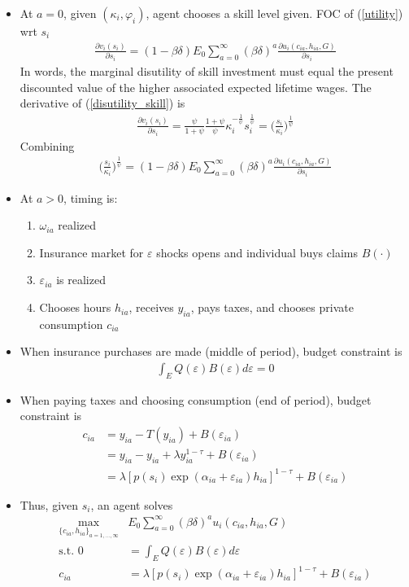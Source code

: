 \documentclass{article}
\begin{document}
\begin{itemize}
\item At $a = 0$, given $(\kappa_i, \varphi_i)$, agent chooses a skill level given. FOC of (\ref{utility}) wrt $s_i$
\begin{align*}
\frac{\partial v_i(s_i)}{\partial s_i} = (1 - \beta \delta) E_0 \sum_{a = 0}^\infty (\beta \delta)^a \frac{\partial u_i(c_{ia}, h_{ia}, G)}{\partial s_i}
\end{align*}
In words, the marginal disutility of skill investment must equal the present discounted value of the higher associated expected lifetime wages. The derivative of (\ref{disutility_skill}) is
\begin{align*}
\frac{\partial v_i(s_i)}{\partial s_i} = \frac{\psi}{1 + \psi} \frac{1 + \psi}{\psi}\kappa_i^{-\frac{1}{\psi}} s_i^\frac{1}{\psi} = \Bigg(\frac{s_i}{\kappa_i}\Bigg)^{\frac{1}{\psi}}
\end{align*}
Combining
\begin{align}
\Bigg(\frac{s_i}{\kappa_i}\Bigg)^{\frac{1}{\psi}} = (1 - \beta \delta) E_0 \sum_{a = 0}^\infty (\beta \delta)^a \frac{\partial u_i(c_{ia}, h_{ia}, G)}{\partial s_i} \label{optimal_skills}
\end{align}
\item At $a > 0$, timing is: 
\begin{enumerate}
\item $\omega_{ia}$ realized
\item Insurance market for $\varepsilon$ shocks opens and individual buys claims $B(\cdot)$
\item $\varepsilon_{ia}$ is realized
\item Chooses hours $h_{ia}$, receives $y_{ia}$, pays taxes, and chooses private consumption $c_{ia}$
\end{enumerate}
\item When insurance purchases are made (middle of period), budget constraint is
\begin{align}
\int_E Q(\varepsilon) B(\varepsilon) d\varepsilon = 0
\end{align}
\item When paying taxes and choosing consumption (end of period), budget constraint is
\begin{align}
c_{ia} 
&= y_{ia} - T(y_{ia})  + B(\varepsilon_{ia})\nonumber \\
&= y_{ia} - y_{ia} + \lambda y_{ia}^{1-\tau}  + B(\varepsilon_{ia})\nonumber \\
&= \lambda [p(s_i) \exp(\alpha_{ia} + \varepsilon_{ia}) h_{ia}]^{1-\tau} + B(\varepsilon_{ia})
\end{align}
\item Thus, given $s_i$, an agent solves
\begin{align*}
\max_{\{c_{ia}, h_{ia}\}_{a = 1, ..., \infty}} &
 E_0 \sum_{a = 0}^\infty (\beta \delta)^a u_i(c_{ia}, h_{ia}, G)\\
\text{s.t. }
0 &= \int_E Q(\varepsilon) B(\varepsilon) d\varepsilon \\
c_{ia} &= \lambda [p(s_i) \exp(\alpha_{ia} + \varepsilon_{ia}) h_{ia}]^{1-\tau} + B(\varepsilon_{ia})
\end{align*}
\end{itemize}
\end{document}

